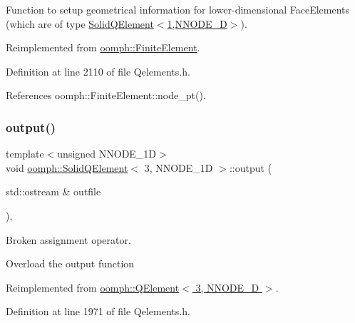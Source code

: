 Function to setup geometrical information for lower-\/dimensional Face\+Elements (which are of type \hyperlink{classoomph_1_1SolidQElement_3_011_00_01NNODE__1D_01_4}{Solid\+Q\+Element$<$1,\+N\+N\+O\+D\+E\+\_\+D$>$}). 

Reimplemented from \hyperlink{classoomph_1_1FiniteElement_aaf7bead5b462cfd5401d97b3dbdc7af7}{oomph\+::\+Finite\+Element}.



Definition at line 2110 of file Qelements.\+h.



References oomph\+::\+Finite\+Element\+::node\+\_\+pt().

\mbox{\label{classoomph_1_1SolidQElement_3_013_00_01NNODE__1D_01_4_a50bd6f3e7c5801a12428198b91e1ef01}} 
\subsubsection{\texorpdfstring{output()}{output()}\hspace{0.1cm}{\footnotesize\ttfamily [1/4]}}
{\footnotesize\ttfamily template$<$unsigned N\+N\+O\+D\+E\+\_\+1D$>$ \\
void \hyperlink{classoomph_1_1SolidQElement}{oomph\+::\+Solid\+Q\+Element}$<$ 3, N\+N\+O\+D\+E\+\_\+1D $>$\+::output (\begin{DoxyParamCaption}\item[{std\+::ostream \&}]{outfile }\end{DoxyParamCaption})\hspace{0.3cm}{\ttfamily [inline]}, {\ttfamily [virtual]}}



Broken assignment operator. 

Overload the output function 

Reimplemented from \hyperlink{classoomph_1_1QElement_3_013_00_01NNODE__1D_01_4_a9859c393a3b4b4808f315cb1baf8dde4}{oomph\+::\+Q\+Element$<$ 3, N\+N\+O\+D\+E\+\_\+D $>$}.



Definition at line 1971 of file Qelements.\+h.



